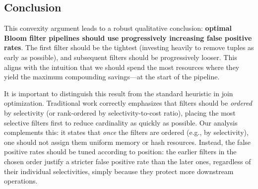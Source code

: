 \subsection{Conclusion}
This convexity argument leads to a robust qualitative conclusion: \textbf{optimal Bloom filter pipelines should use progressively increasing false positive rates}.
The first filter should be the tightest (investing heavily to remove tuples as early as possible), and subsequent filters should be progressively looser. This aligns with the intuition that we should spend the most resources where they yield the maximum compounding savings—at the start of the pipeline.

It is important to distinguish this result from the standard heuristic in join optimization. Traditional work correctly emphasizes that filters should be \emph{ordered} by selectivity (or rank-ordered by selectivity-to-cost ratio), placing the most selective filters first to reduce cardinality as quickly as possible.
Our analysis complements this: it states that \emph{once} the filters are ordered (e.g., by selectivity), one should not assign them uniform memory or hash resources. Instead, the false positive rates should be tuned according to position: the earlier filters in the chosen order justify a stricter false positive rate than the later ones, regardless of their individual selectivities, simply because they protect more downstream operations.

